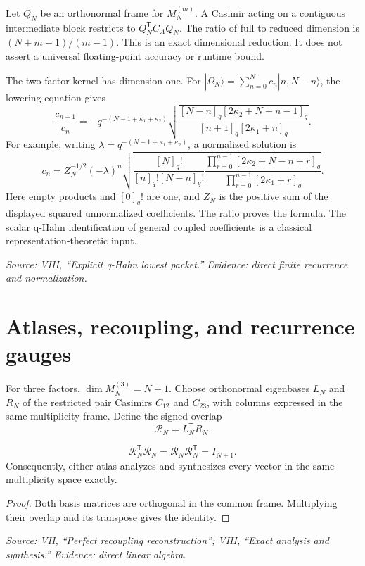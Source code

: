 Let $Q_N$ be an orthonormal frame for $M_N^{(m)}$. A Casimir acting on a contiguous intermediate block restricts to $Q_N^{\mathsf T}C_AQ_N$. The ratio of full to reduced dimension is $(N+m-1)/(m-1)$. This is an exact dimensional reduction. It does not assert a universal floating-point accuracy or runtime bound.

The two-factor kernel has dimension one. For $|\Omega_N\rangle=\sum_{n=0}^N c_n|n,N-n\rangle$, the lowering equation gives
\[
\frac{c_{n+1}}{c_n}
=-q^{-(N-1+\kappa_1+\kappa_2)}
\sqrt{\frac{[N-n]_q[2\kappa_2+N-n-1]_q}
{[n+1]_q[2\kappa_1+n]_q}}.
\]
For example, writing $\lambda=q^{-(N-1+\kappa_1+\kappa_2)}$, a normalized solution is
\[
c_n=Z_N^{-1/2}(-\lambda)^n
\sqrt{\frac{[N]_q!}{[n]_q![N-n]_q!}
\frac{\prod_{r=0}^{n-1}[2\kappa_2+N-n+r]_q}
{\prod_{r=0}^{n-1}[2\kappa_1+r]_q}}.
\]
Here empty products and $[0]_q!$ are one, and $Z_N$ is the positive sum of the displayed squared unnormalized coefficients. The ratio proves the formula. The scalar q-Hahn identification of general coupled coefficients is a classical representation-theoretic input.

\noindent\emph{Source: VIII, ``Explicit q-Hahn lowest packet.'' Evidence: direct finite recurrence and normalization.}

\section{Atlases, recoupling, and recurrence gauges}

For three factors, $\dim M_N^{(3)}=N+1$. Choose orthonormal eigenbases $L_N$ and $R_N$ of the restricted pair Casimirs $C_{12}$ and $C_{23}$, with columns expressed in the same multiplicity frame. Define the signed overlap
\[
\mathcal R_N=L_N^{\mathsf T}R_N.
\]

\begin{theorem}
\[
\mathcal R_N^{\mathsf T}\mathcal R_N
=\mathcal R_N\mathcal R_N^{\mathsf T}=I_{N+1}.
\]
Consequently, either atlas analyzes and synthesizes every vector in the same multiplicity space exactly.
\end{theorem}

\begin{proof}
Both basis matrices are orthogonal in the common frame. Multiplying their overlap and its transpose gives the identity.
\end{proof}

\noindent\emph{Source: VII, ``Perfect recoupling reconstruction''; VIII, ``Exact analysis and synthesis.'' Evidence: direct linear algebra.}

